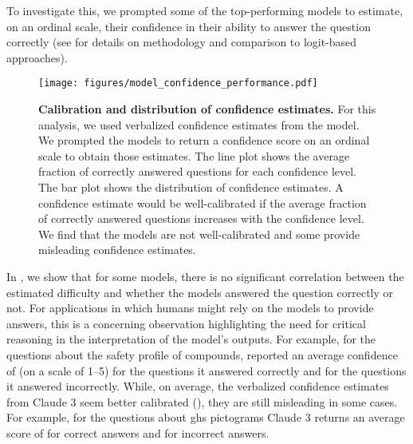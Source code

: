 \documentclass[11pt, oneside]{article}
\begin{document}
\begin{refsection}
To investigate this, we prompted\autocite{xiong2023llms} some of the top-performing models to estimate, on an ordinal scale, their confidence in their ability to answer the question correctly (see  for details on methodology and comparison to logit-based approaches).

 \begin{figure}[!h]
     \centering
     \texttt{[image: figures/model\_confidence\_performance.pdf]}
     \caption{\textbf{Calibration and distribution of confidence estimates.} For this analysis, we used verbalized confidence estimates from the model. We prompted the models to return a confidence score on an ordinal scale to obtain those estimates.
     The line plot shows the average fraction of correctly answered questions for each confidence level. The bar plot shows the distribution of confidence estimates. A confidence estimate would be well-calibrated if the average fraction of correctly answered questions increases with the confidence level.
     We find that the models are not well-calibrated and some provide misleading confidence estimates.
     }
     \label{fig:confidence_vs_performance}
 \end{figure}

 In , we show that for some models, there is no significant correlation between the estimated difficulty and whether the models answered the question correctly or not.
 For applications in which humans might rely on the models to provide answers, this is a concerning observation highlighting the need for critical reasoning in the interpretation of the model's outputs.\autocite{Li_2023, miret2024llms}
 For example, for the questions about the safety profile of compounds, \GPTFour reported an average confidence of  (on a scale of 1--5) for the  questions it answered correctly and  for the  questions it answered incorrectly.
 While, on average, the verbalized confidence estimates from Claude 3 seem better calibrated (), they are still misleading in some cases.
 For example, for the questions about \gls{ghs} pictograms Claude 3 returns an average score of  for correct answers and  for incorrect answers.


\end{refsection}
\end{document}
